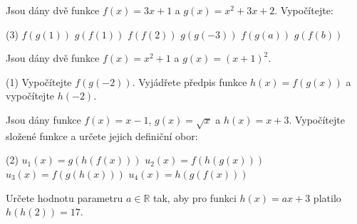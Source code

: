 \documentclass[12pt,a4paper]{article}
\begin{document}
\begin{exercise}
    Jsou dány dvě funkce \(f(x)=3x+1\) a \(g(x)=x^{2}+3x+2\). Vypočítejte:
    \begin{tasks}(3)
        \task \(f(g(1))\)
        \task \(g(f(1))\)
        \task \(f(f(2))\)
        \task \(g(g(-3))\)
        \task \(f(g(a))\)
        \task \(g(f(b))\)
    \end{tasks}
\end{exercise}


\begin{exercise}
    Jsou dány dvě funkce \(f(x)=x^{2}+1\) a \(g(x)=(x+1)^{2}\).
    \begin{tasks}(1)
        \task Vypočítejte \(f(g(-2))\).
        \task Vyjádřete předpis funkce \(h(x)=f(g(x))\) a vypočítejte \(h(-2)\).
    \end{tasks}
\end{exercise}


\begin{exercise}
    Jsou dány funkce \(f(x)=x-1\), \(g(x)=\sqrt{x}\) a \(h(x)=x+3\). Vypočítejte složené funkce a určete jejich definiční obor:
    \begin{tasks}(2)
        \task \(u_{1}(x)=g(h(f(x)))\)
        \task \(u_{2}(x)=f(h(g(x)))\)
        \task \(u_{3}(x)=f(g(h(x)))\)
        \task \(u_{4}(x)=h(g(f(x)))\)
    \end{tasks}
\end{exercise}


\begin{exercise}
    Určete hodnotu parametru \(a\in\mathbb{R}\) tak, aby pro funkci \(h(x)=ax+3\) platilo \(h(h(2))=17.\)
\end{exercise}
\end{document}

